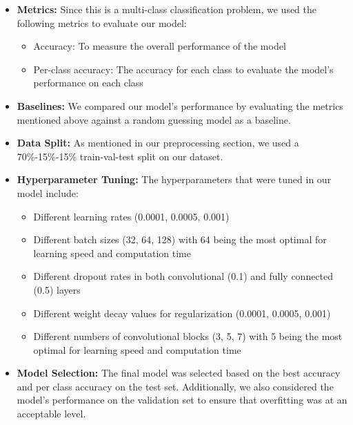 \documentclass[10pt]{article}
\begin{document}
\begin{itemize}
    \item \textbf{Metrics:} Since this is a multi-class classification problem, we used the following metrics to evaluate our model:
    \begin{itemize}
        \item Accuracy: To measure the overall performance of the model
        \item Per-class accuracy: The accuracy for each class to evaluate the model's performance on each class
    \end{itemize}

    \item \textbf{Baselines:} We compared our model's performance by evaluating the metrics mentioned above against a random guessing model as a baseline.

    \item \textbf{Data Split:} As mentioned in our preprocessing section, we used a 70\%-15\%-15\% train-val-test split on our dataset.
    
    \item \textbf{Hyperparameter Tuning:} The hyperparameters that were tuned in our model include:
    \begin{itemize}
        \item Different learning rates (0.0001, 0.0005, 0.001)
        \item Different batch sizes (32, 64, 128) with 64 being the most optimal for learning speed and computation time
        \item Different dropout rates in both convolutional (0.1) and fully connected (0.5) layers
        \item Different weight decay values for regularization (0.0001, 0.0005, 0.001)
        \item Different numbers of convolutional blocks (3, 5, 7) with 5 being the most optimal for learning speed and computation time
    \end{itemize}
    
    \item \textbf{Model Selection:} The final model was selected based on the best accuracy and per class accuracy on the test set. Additionally, we also considered the model's performance on the 
    validation set to ensure that overfitting was at an acceptable level.
\end{itemize}
\end{document}
